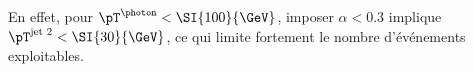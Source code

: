 En effet, pour $\pT^{\photon}<\SI{100}{\GeV}$, imposer $\alpha<\num{0.3}$ implique $\pT^\text{jet 2}<\SI{30}{\GeV}$, ce qui limite fortement le nombre d'événements exploitables.

